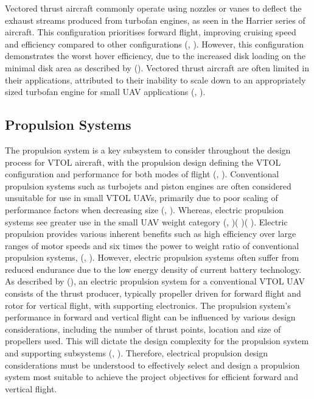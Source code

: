 Vectored thrust aircraft commonly operate using nozzles or vanes to deflect the exhaust streams produced from turbofan engines, as seen in the Harrier series of aircraft. This configuration prioritises forward flight, improving cruising speed and efficiency compared to other configurations (\citeauthor{RN15}, \citeyear{RN15}). However, this configuration demonstrates the worst hover efficiency, due to the increased disk loading on the minimal disk area as described by \citeauthor{maisel2000history} (\citeyear{maisel2000history}). Vectored thrust aircraft are often limited in their applications, attributed to their inability to scale down to an appropriately sized turbofan engine for small UAV applications (\citeauthor{RN15}, \citeyear{RN15}). 


\subsection{Propulsion Systems} 

The propulsion system is a key subsystem to consider throughout the design process for VTOL aircraft, with the propulsion design defining the VTOL configuration and performance for both modes of flight (\citeauthor{RN15}, \citeyear{RN15}). Conventional propulsion systems such as turbojets and piston engines are often considered unsuitable for use in small VTOL UAVs, primarily due to poor scaling of performance factors when decreasing size (\citeauthor{moore2014misconceptions}, \citeyear{moore2014misconceptions}). Whereas, electric propulsion systems see greater use in the small UAV weight category (\citeauthor{rothhaar2014nasa}, \citeyear{rothhaar2014nasa})( \citeauthor{Mugin} \citeyear{Mugin})(\citeauthor{RN8} \citeyear{RN8}). Electric propulsion provides various inherent benefits such as high efficiency over large ranges of motor speeds and six times the power to weight ratio of conventional propulsion systems, (\citeauthor{moore2014misconceptions}, \citeyear{moore2014misconceptions}). However, electric propulsion systems often suffer from reduced endurance due to the low energy density of current battery technology.  As described by \citeauthor{dundar2020design} (\citeyear{dundar2020design}), an electric propulsion system for a conventional VTOL UAV consists of the thrust producer, typically propeller driven for forward flight and rotor for vertical flight, with supporting electronics. The propulsion system’s performance in forward and vertical flight can be influenced by various design considerations, including the number of thrust points, location and size of propellers used. This will dictate the design complexity for the propulsion system and supporting subsystems (\citeauthor{cetinsoy2012design}, \citeyear{cetinsoy2012design}). Therefore, electrical propulsion design considerations must be understood to effectively select and design a propulsion system most suitable to achieve the project objectives for efficient forward and vertical flight. \\

